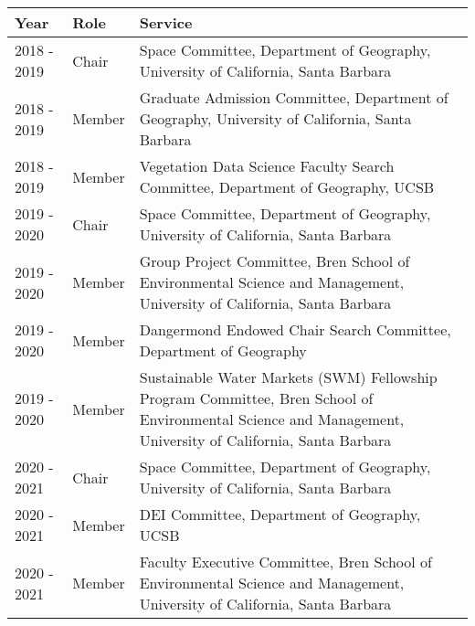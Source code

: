 
\begin{longtable}{llp{12cm}}
Year & Role & Service\\
\hline 
\endhead 
2018 - 2019 & Chair & Space Committee, Department of Geography, University of California, Santa Barbara \\
2018 - 2019 & Member & Graduate Admission Committee, Department of Geography, University of California, Santa Barbara \\
2018 - 2019 & Member & Vegetation Data Science Faculty Search Committee, Department of Geography, UCSB \\
2019 - 2020 & Chair & Space Committee, Department of Geography, University of California, Santa Barbara \\
2019 - 2020 & Member & Group Project Committee, Bren School of Environmental Science and Management, University of California, Santa Barbara \\
2019 - 2020 & Member & Dangermond Endowed Chair Search Committee, Department of Geography \\
2019 - 2020 & Member  & Sustainable Water Markets (SWM) Fellowship Program Committee, Bren School of Environmental Science and Management, University of California, Santa Barbara \\
2020 - 2021 & Chair & Space Committee, Department of Geography, University of California, Santa Barbara \\
2020 - 2021 & Member & DEI Committee, Department of Geography, UCSB \\
2020 - 2021 & Member & Faculty Executive Committee, Bren School of Environmental Science and Management, University of California, Santa Barbara \\
\end{longtable}

